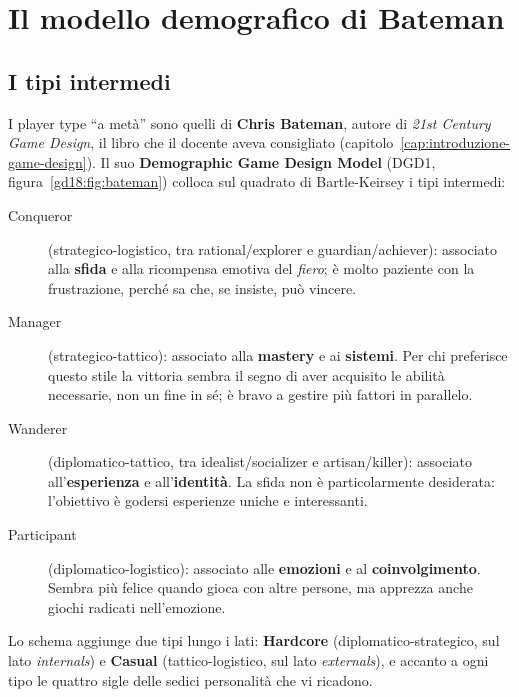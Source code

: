 \section{Il modello demografico di Bateman}
\label{gd18:sec:bateman}


\subsection{I tipi intermedi}

I player type ``a metà'' sono quelli di \textbf{Chris Bateman}, autore di
\emph{21st Century Game Design}, il libro che il docente aveva consigliato
(capitolo~\ref{cap:introduzione-game-design}). Il suo \textbf{Demographic Game
Design Model} (DGD1, figura~\ref{gd18:fig:bateman}) colloca sul quadrato di
Bartle-Keirsey i tipi intermedi:
\begin{description}
  \item[Conqueror] (strategico-logistico, tra rational/explorer e guardian/achiever):
        associato alla \textbf{sfida} e alla ricompensa emotiva del \emph{fiero}; è
        molto paziente con la frustrazione, perché sa che, se insiste, può vincere.
  \item[Manager] (strategico-tattico): associato alla \textbf{mastery} e ai
        \textbf{sistemi}. Per chi preferisce questo stile la vittoria sembra il segno
        di aver acquisito le abilità necessarie, non un fine in sé; è bravo a gestire
        più fattori in parallelo.
  \item[Wanderer] (diplomatico-tattico, tra idealist/socializer e
        artisan/killer):
        associato all'\textbf{esperienza} e all'\textbf{identità}. La sfida non è
        particolarmente desiderata: l'obiettivo è godersi esperienze uniche e
        interessanti.
  \item[Participant] (diplomatico-logistico): associato alle \textbf{emozioni} e al
        \textbf{coinvolgimento}. Sembra più felice quando gioca con altre persone, ma
        apprezza anche giochi radicati nell'emozione.
\end{description}
Lo schema aggiunge due tipi lungo i lati: \textbf{Hardcore}
(diplomatico-strategico, sul lato \emph{internals}) e \textbf{Casual}
(tattico-logistico, sul lato \emph{externals}), e accanto a ogni tipo le quattro
sigle delle sedici personalità che vi ricadono.


